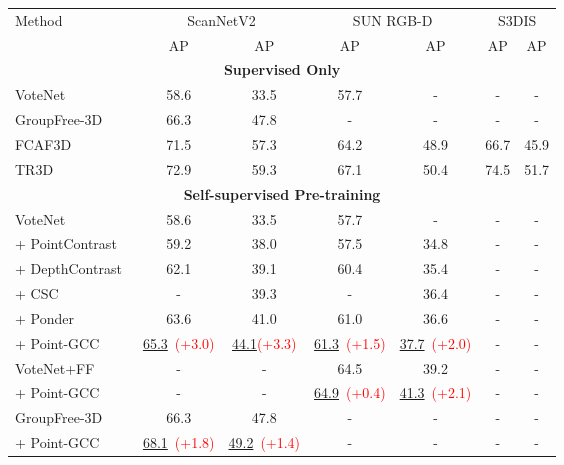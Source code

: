 \documentclass{article}
\begin{document}
\begin{table}
\centering
\resizebox{0.85\linewidth}{!}
{
   \begin{tabular}{lcccccc}
    \toprule
    \multirow{2}{*}{Method} & \multicolumn{2}{c}{ScanNetV2} & \multicolumn{2}{c}{SUN RGB-D} & \multicolumn{2}{c}{S3DIS} \\
    \cmidrule(r){2-3}
    \cmidrule(r){4-5}
    \cmidrule(r){6-7}
     & AP & AP &  AP & AP &  AP & AP   \\     
    \midrule
    \multicolumn{7}{c}{\textbf{Supervised Only}} \\
    \midrule
    VoteNet~\cite{VoteNet} & 58.6 & 33.5 & 57.7 & - & - & - \\
    GroupFree-3D~\cite{GroupFree} & 66.3 & 47.8 & - & - & - & - \\
    FCAF3D~\cite{FCAF3D} & 71.5 & 57.3 & 64.2 & 48.9 & 66.7 & 45.9 \\
    TR3D~\cite{TR3D} & 72.9 & 59.3 & 67.1 & 50.4 & 74.5 & 51.7 \\
    \midrule
    \multicolumn{7}{c}{\textbf{Self-supervised Pre-training}} \\
    \midrule
    VoteNet~\cite{VoteNet} & 58.6 & 33.5 & 57.7 & - & - & - \\
    + PointContrast~\cite{PointContrast} & 59.2 & 38.0 & 57.5 & 34.8 & - & - \\
    + DepthContrast~\cite{DepthContrast} & 62.1 & 39.1 & 60.4 & 35.4 & - & - \\
    + CSC~\cite{CSC} & - & 39.3 & - & 36.4 & - & - \\
    + Ponder~\cite{Ponder} & 63.6 & 41.0 & 61.0 & 36.6 & - & - \\
    \rowcolor{linecolor2}+ Point-GCC & \underline{65.3}~\tiny{\textcolor{red}{(+3.0)}} & \underline{44.1}\tiny{\textcolor{red}{(+3.3)}} & \underline{61.3}~\tiny{\textcolor{red}{(+1.5)}} & \underline{37.7}~\tiny{\textcolor{red}{(+2.0)}} & - & - \\
    \midrule
    VoteNet+FF~\cite{TR3D} & - & - & 64.5 & 39.2 & - & - \\
    \rowcolor{linecolor2}+ Point-GCC & - & - & \underline{64.9}~\tiny{\textcolor{red}{(+0.4)}} & \underline{41.3}~\tiny{\textcolor{red}{(+2.1)}} & - & - \\
    \midrule
    GroupFree-3D~\cite{GroupFree} & 66.3 & 47.8 & - & - & - & - \\
    \rowcolor{linecolor2}+ Point-GCC & \underline{68.1}~\tiny{\textcolor{red}{(+1.8)}} & \underline{49.2}~\tiny{\textcolor{red}{(+1.4)}} & - & - & - & - \\

\end{tabular}}
\end{table}
\end{document}
